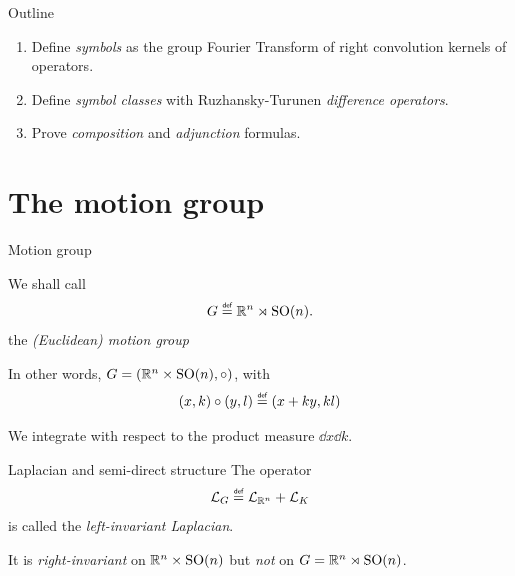 \documentclass[handout]{beamer}
\begin{document}
\begin{frame}{Outline}
    \begin{enumerate}
        \item Define \emph{symbols} as the group Fourier Transform of right convolution kernels of operators.
        \item Define \emph{symbol classes} with Ruzhansky-Turunen \emph{difference operators}.
        \item Prove \emph{composition} and \emph{adjunction} formulas.
    \end{enumerate}
\end{frame}

\section{The motion group}

\begin{frame}{Motion group}
    \begin{definition}
        We shall call
        \begin{align*}
            \Group \defeq \R^n \rtimes \SpecialOrthogonalGroup n.
        \end{align*}
        the \emph{(Euclidean) motion group}
    \end{definition}

    \pause

    In other words, $G = (\mathbb{R}^n \times {\mathrm{SO} (n)}, \circ)$,
    with
    \begin{align*}
        (x, k) \circ (y, l) \defeq (x + k y, k l)
    \end{align*}

    \pause

    We integrate with respect to the product measure $\dd x \dd k$.
\end{frame}

\begin{frame}{Laplacian and semi-direct structure}
    The operator
    \begin{align*}
        \Laplacian \defeq \Laplacian [\R^n] + \Laplacian [\CompactGroup]
    \end{align*}
    is called the \emph{left-invariant Laplacian}.

    \pause

    It is \emph{right-invariant} on $\mathbb{R}^n \times {\mathrm{SO} (n)}$
    but \emph{not} on $G = \mathbb{R}^n \rtimes {\mathrm{SO} (n)}$.
\end{frame}
\end{document}
